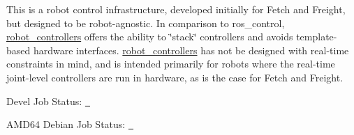 This is a robot control infrastructure, developed initially for Fetch and Freight, but designed to be robot-\/agnostic. In comparison to ros\+\_\+control, \mbox{\hyperlink{namespacerobot__controllers}{robot\+\_\+controllers}} offers the ability to \char`\"{}stack\char`\"{} controllers and avoids template-\/based hardware interfaces. \mbox{\hyperlink{namespacerobot__controllers}{robot\+\_\+controllers}} has not be designed with real-\/time constraints in mind, and is intended primarily for robots where the real-\/time joint-\/level controllers are run in hardware, as is the case for Fetch and Freight.


\begin{DoxyItemize}
\item Devel Job Status\+: \href{http://build.ros.org/job/Mdev__robot_controllers__ubuntu_bionic_amd64/}{\texttt{ }}
\item A\+M\+D64 Debian Job Status\+: \href{http://build.ros.org/view/Mbin_uB64/job/Mbin_uB64__robot_controllers__ubuntu_bionic_amd64__binary/}{\texttt{ }} 
\end{DoxyItemize}